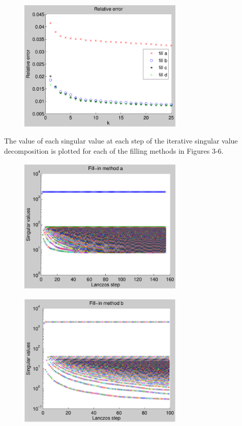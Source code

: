 \documentclass[11pt]{article} %
\begin{document}
\begin{figure}[h!]
  \centering
    \includegraphics[width=0.7\textwidth]{relative}
  \caption{}
\label{fig:relative}
\end{figure}

The value of each singular value at each step of the iterative singular value decomposition is plotted for each of the filling methods in Figures 3-6.

\begin{figure}[h!]
  \centering
    \includegraphics[width=0.7\textwidth]{sv_a}
  \caption{}
\label{fig:sv_a}
\end{figure}

\begin{figure}[h!]
  \centering
    \includegraphics[width=0.7\textwidth]{sv_b}
  \caption{}
\label{fig:sv_b}
\end{figure}
\end{document}
